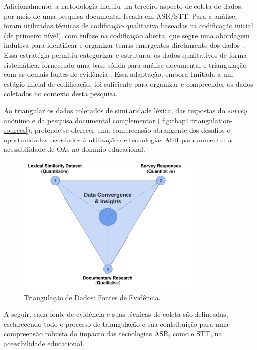 Adicionalmente, a metodologia incluiu um terceiro aspecto de coleta de dados, por meio de uma pesquisa documental focada em ASR/STT. Para a análise, foram utilizadas técnicas de codificação qualitativa baseadas na codificação inicial (de primeiro nível), com ênfase na codificação aberta, que segue uma abordagem indutiva para identificar e organizar temas emergentes diretamente dos dados \cite{Charmaz2006, Martinelli2023}. Essa estratégia permitiu categorizar e estruturar os dados qualitativos de forma sistemática, fornecendo uma base sólida para análise documental e triangulação com as demais fontes de evidência \cite{LimaJunior2021}. Essa adaptação, embora limitada a um estágio inicial de codificação, foi suficiente para organizar e compreender os dados coletados no contexto desta pesquisa.

Ao triangular os dados coletados de similaridade léxica, das respostas do \textit{survey} anônimo e da pesquisa documental complementar (\autoref{fig:chap4:triangulation-sources}), pretende-se oferecer uma compreensão abrangente dos desafios e oportunidades associados à utilização de tecnologias ASR para aumentar a acessibilidade de OAs no domínio educacional. 

\begin{figure}[htb]
\centering
\includegraphics[width=0.8\textwidth]{images/chapter4-cs1-triangulation-sources.png}
\caption{Triangulação de Dados: Fontes de Evidência.}
\label{fig:chap4:triangulation-sources}
\end{figure}

A seguir, cada fonte de evidência e suas técnicas de coleta são delineadas, esclarecendo todo o processo de triangulação e sua contribuição para uma compreensão robusta do impacto das tecnologias ASR, como o STT, na acessibilidade educacional.

